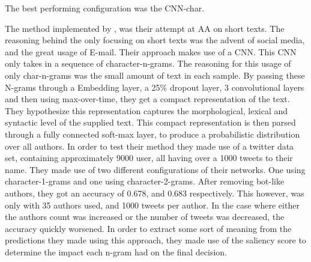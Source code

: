 The best performing configuration was the CNN-char.

The method implemented by \cite{shrestha2017}, was their attempt at \gls{AA}
on short texts. The reasoning behind the only focusing on short texts was the
advent of social media, and the great usage of E-mail. Their approach makes use
of a \gls{CNN}. This \gls{CNN} only takes in a sequence of character-n-grams.
The reasoning for this usage of only char-n-grams was the small amount of text
in each sample. By passing these N-grams through a Embedding layer, a 25\%
dropout layer, 3 convolutional layers and then using max-over-time, they get
a compact representation of the text. They hypothesize this representation
captures the morphological, lexical and syntactic level of the supplied text.
This compact representation is then parsed through a fully connected soft-max
layer, to produce a probabilistic distribution over all authors. In order to
test their method they made use of a twitter data set, containing approximately
9000 user, all having over a 1000 tweets to their name. They made use of two
different configurations of their networks. One using character-1-grams and one
using character-2-grams. After removing bot-like authors, they got an accuracy
of 0.678, and 0.683 respectively. This however, was only with 35 authors used,
and 1000 tweets per author. In the case where either the authors count was
increased or the number of tweets was decreased, the accuracy quickly worsened.
In order to extract some sort of meaning from the predictions they made using
this approach, they made use of the saliency score to determine the impact each
n-gram had on the final decision.
